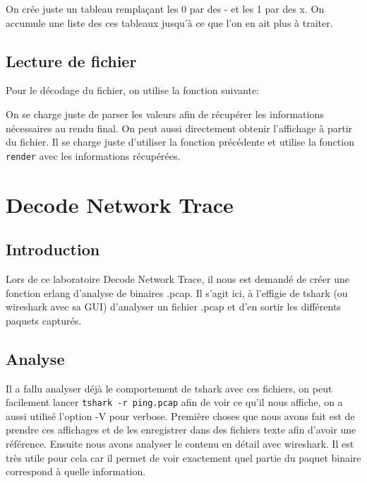 \documentclass[10pt,a4paper]{article}
\begin{document}


On crée juste un tableau remplaçant les 0 par des - et les 1 par des x. On accumule une liste des ces tableaux jusqu'à ce que l'on en ait plus à traiter.\\

\subsection{Lecture de fichier}

Pour le décodage du fichier, on utilise la fonction suivante:



On se charge juste de parser les valeurs afin de récupérer les informations nécessaires au rendu final. On peut aussi directement obtenir l'affichage à partir du fichier. Il se charge juste d'utiliser la fonction précédente et utilise la fonction \texttt{render} avec les informations récupérées.



\section{Decode Network Trace}
\subsection{Introduction}
Lors de ce laboratoire Decode Network Trace, il nous est demandé de créer une fonction erlang d'analyse de binaires .pcap. Il s'agit ici, à l'effigie de tshark (ou wireshark avec sa GUI) d'analyser un fichier .pcap et d'en sortir les différents paquets capturés.

\subsection{Analyse}
Il a fallu analyser déjà le comportement de tshark avec ces fichiers, on peut facilement lancer \texttt{tshark -r ping.pcap} afin de voir ce qu'il nous affiche, on a aussi utilisé l'option -V pour verbose. Première choses que nous avons fait est de prendre ces affichages et de les enregistrer dans des fichiers texte afin d'avoir une référence. Ensuite nous avons analyser le contenu en détail avec wireshark. Il est très utile pour cela car il permet de voir exactement quel partie du paquet binaire correspond à quelle information.
\end{document}
